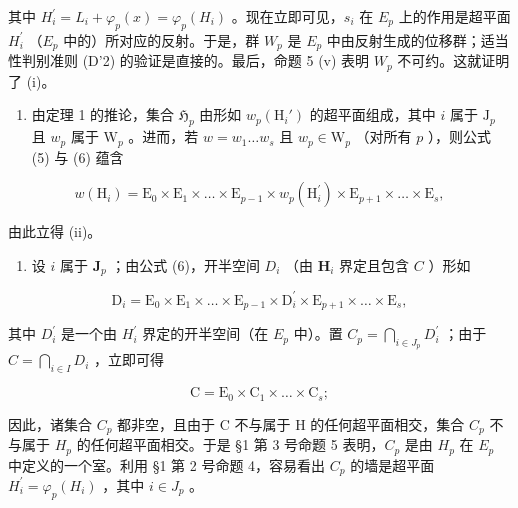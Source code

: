 其中 \(H_{i}^{\prime}=L_{i}+\varphi_{p}(x)=\varphi_{p}(H_{i})\) 。现在立即可见，\(s_{i}\) 在 \(E_{p}\) 上的作用是超平面 \(H_{i}^{\prime}\) （\(E_{p}\) 中的）所对应的反射。于是，群 \(W_{p}\) 是 \(E_{p}\) 中由反射生成的位移群；适当性判别准则 (D'2) 的验证是直接的。最后，命题 5 (v) 表明 \(W_{p}\) 不可约。这就证明了 (i)。

\begin{enumerate}
\def\labelenumi{(\roman{enumi})}
\setcounter{enumi}{1}
\tightlist
\item
  由定理 1 的推论，集合 \(\mathfrak{H}_p\) 由形如 \(w_p(\mathrm{H}_i')\) 的超平面组成，其中 \(i\) 属于 \(\mathrm{J}_p\) 且 \(w_p\) 属于 \(\mathrm{W}_p\) 。进而，若 \(w = w_1 \ldots w_s\) 且 \(w_p \in \mathrm{W}_p\) （对所有 \(p\) ），则公式 (5) 与 (6) 蕴含
\end{enumerate}

\[
w (\mathrm{H} _ {i}) = \mathrm{E} _ {0} \times \mathrm{E} _ {1} \times \dots \times \mathrm{E} _ {p - 1} \times w _ {p} (\mathrm{H} _ {i} ^ {\prime}) \times \mathrm{E} _ {p + 1} \times \dots \times \mathrm{E} _ {s},\tag{7}
\]

由此立得 (ii)。

\begin{enumerate}
\def\labelenumi{(\roman{enumi})}
\setcounter{enumi}{2}
\tightlist
\item
  设 \(i\) 属于 \(\mathbf{J}_p\) ；由公式 (6)，开半空间 \(D_i\) （由 \(\mathbf{H}_i\) 界定且包含 \(C\) ）形如
\end{enumerate}

\[
\mathrm{D} _ {i} = \mathrm{E} _ {0} \times \mathrm{E} _ {1} \times \dots \times \mathrm{E} _ {p - 1} \times \mathrm{D} _ {i} ^ {\prime} \times \mathrm{E} _ {p + 1} \times \dots \times \mathrm{E} _ {s},
\]

其中 \(D_{i}^{\prime}\) 是一个由 \(H_{i}^{\prime}\) 界定的开半空间（在 \(E_{p}\) 中）。置 \(C_{p} = \bigcap_{i \in J_{p}} D_{i}^{\prime}\) ；由于 \(C = \bigcap_{i \in I} D_{i}\) ，立即可得

\[
\mathrm{C} = \mathrm{E} _ {0} \times \mathrm{C} _ {1} \times \dots \times \mathrm{C} _ {s};
\]

因此，诸集合 \(C_{p}\) 都非空，且由于 C 不与属于 H 的任何超平面相交，集合 \(C_{p}\) 不与属于 \(H_{p}\) 的任何超平面相交。于是 §1 第 3 号命题 5 表明，\(C_{p}\) 是由 \(H_{p}\) 在 \(E_{p}\) 中定义的一个室。利用 §1 第 2 号命题 4，容易看出 \(C_{p}\) 的墙是超平面 \(H_{i}^{\prime} = \varphi_{p}(H_{i})\) ，其中 \(i \in J_{p}\) 。

